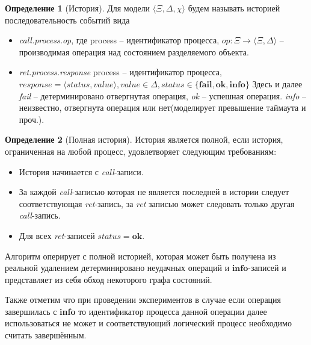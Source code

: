 \documentclass[pdftex,ptm,14pt,a4paper]{extreport}
\theoremstyle{definition}
\newtheorem{definition}{Определение}[chapter]
\begin{document}
\begin{definition}[История]
    Для модели $\langle \Xi, \Delta, \chi \rangle$ будем называть историей последовательность событий вида
    \begin{itemize}
        \item \textit{call.process.op}, где process --  идентификатор процесса,
             $\textit{op}: \Xi \rightarrow \langle \Xi, \Delta \rangle$  -- производимая операция над состоянием разделяемого объекта.
        \item \textit{ret.process.response} process -- идентификатор процесса,
            $\textit{response} = \langle \textit{status}, \textit{value} \rangle,
            \textit{value} \in \Delta,
            \textit{status} \in \{\textbf{fail},\textbf{ok},\textbf{info}\}$
            Здесь и далее
        \subitem \textit{fail} -- детерминировано отвергнутая операция,
        \subitem \textit{ok} -- успешная операция.
        \subitem \textit{info} -- неизвестно, отвергнута операция или нет(моделирует превышение таймаута и проч.).
    \end{itemize}
\end{definition}

\begin{definition}[Полная история]
    История является полной, если история, ограниченная на любой процесс, удовлетворяет следующим требованиям:
    \begin{itemize}
        \item История начинается с \textit{call}-записи.
        \item За каждой \textit{call}-записью которая не является последней в истории
            следует соответствующая \textit{ret}-запись,
            за \textit{ret} записью может следовать только другая \textit{call}-запись.
        \item Для всех \textit{ret}-записей $\textit{status} = \textbf{ok}.$
    \end{itemize}
\end{definition}

Алгоритм оперирует с полной историей, которая может быть получена из реальной удалением
детерминировано неудачных операций и $\textbf{info}$-записей и представляет из себя обход некоторого графа состояний.

Также отметим что при проведении экспериментов в случае если операция завершилась с \textbf{info}
то идентификатор процесса данной операции далее использоваться не может и соответствующий
логический процесс необходимо считать завершённым.
\end{document}
